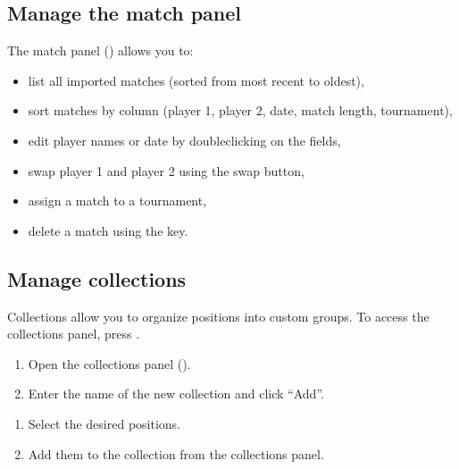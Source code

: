 \documentclass[letterpaper,10pt,english]{sphinxmanual}
\begin{document}
\subsection{Manage the match panel}
\label{\detokenize{guide_utilisateur:gerer-le-panneau-des-matchs}}
\sphinxAtStartPar
The match panel () allows you to:
\begin{itemize}
\item {} 
\sphinxAtStartPar
list all imported matches (sorted from most recent to oldest),

\item {} 
\sphinxAtStartPar
sort matches by column (player 1, player 2, date, match length, tournament),

\item {} 
\sphinxAtStartPar
edit player names or date by double\sphinxhyphen{}clicking on the fields,

\item {} 
\sphinxAtStartPar
swap player 1 and player 2 using the swap button,

\item {} 
\sphinxAtStartPar
assign a match to a tournament,

\item {} 
\sphinxAtStartPar
delete a match using the  key.

\end{itemize}


\subsection{Manage collections}
\label{\detokenize{guide_utilisateur:gerer-les-collections}}
\sphinxAtStartPar
Collections allow you to organize positions into custom groups. To access the collections panel, press .

\sphinxAtStartPar
{}
\begin{enumerate}
%
\item {} 
\sphinxAtStartPar
Open the collections panel ().

\item {} 
\sphinxAtStartPar
Enter the name of the new collection and click “Add”.

\end{enumerate}

\sphinxAtStartPar
{}
\begin{enumerate}
%
\item {} 
\sphinxAtStartPar
Select the desired positions.

\item {} 
\sphinxAtStartPar
Add them to the collection from the collections panel.

\end{enumerate}
\end{document}
